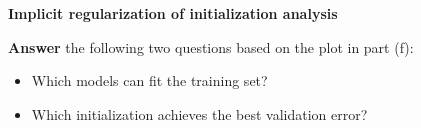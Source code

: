 \item {} \textbf{Implicit regularization of initialization analysis}

\textbf{Answer} the following two questions based on the plot in part (f):

\begin{itemize}
    \item Which models can fit the training set?
    
    \item Which initialization achieves the best validation error? 
\end{itemize}



